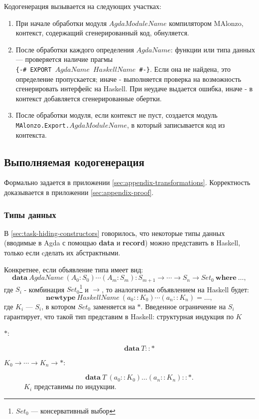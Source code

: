 Кодогенерация вызывается на следующих участках:
\begin{enumerate}
\item При начале обработки модуля \(AgdaModuleName\) компилятором MAlonzo,
      контекст, содержащий сгенерированный код, обнуляется.
\item После обработки каждого определения \(AgdaName\): функции или типа данных ---
      проверяется наличие прагмы \\\texttt{\{-\# EXPORT \(AgdaName\) \(HaskellName\) \#-\}}.
      Если она не найдена, это определение пропускается; иначе - выполняется проверка
      на возможность сгенерировать интерфейс на Haskell. При неудаче выдается ошибка,
      иначе - в контекст добавляется сгенерированные обертки.
\item После обработки модуля, если контекст не пуст, создается модуль\\
      \texttt{MAlonzo.Export.\(AgdaModuleName\)}, в который записывается код из контекста.
\end{enumerate}

\subsection{Выполняемая кодогенерация}

Формально задается в приложении \ref{sec:appendix-transformations}.
Корректность доказывается в приложении \ref{sec:appendix-proof}.

\subsubsection{Типы данных}\label{sec:implementation-datatypes}

В \ref{sec:task-hiding-constructors} говорилось, что некоторые типы данных
(вводимые в Agda с помощью \textbf{data} и \textbf{record}) можно
представить в Haskell, только если cделать их абстрактными.

Конкретнее, если объявление типа имеет вид:
\[
\mathbf{data}\ AgdaName\ (A_0 : S_0) \cdots (A_m : S_m) :
S_{m+1} \rightarrow \cdots \rightarrow S_n \rightarrow Set_0\ \mathbf{where}\ \dots,
\]
где \(S_i\) - комбинация \(Set_0\)\footnote{\(Set_0\) --- консервативный выбор}
и \(\rightarrow\), то аналогичным объявлением на Haskell будет:
\[
\mathbf{newtype}\ HaskellName\ (a_0 :: K_0) \cdots (a_n :: K_n) = \dots,
\]
где \(K_i\) --- \(S_i\), в котором \(Set_0\) заменяется на \(*\).
Введенное ограничение на \(S_i\) гарантирует, что такой тип представим
в Haskell: структурная индукция по \(K\)
\begin{description}
\item[\(*\): ]
\[
\mathbf{data}\ T :: *
\]
\item[\(K_0 \rightarrow \cdots \rightarrow K_n \rightarrow *\): ]
\[
\mathbf{data}\ T\ (a_0 :: K_0) \ldots (a_n :: K_n) :: *.
\]
\(K_i\) представимы по индукции.
\end{description}

